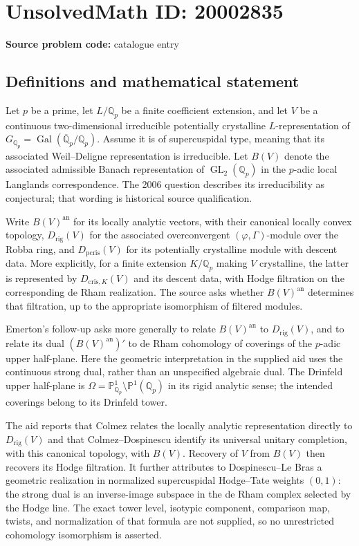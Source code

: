 \documentclass[11pt]{article}
\newcommand{\Q}{\mathbb{Q}}
\newcommand{\PP}{\mathbb{P}}
\begin{document}
\section*{UnsolvedMath ID: 20002835}
\textbf{Source problem code:} catalogue entry
\subsection{Definitions and mathematical statement}
Let $p$ be a prime, let $L/\Q_p$ be a finite coefficient extension, and let $V$ be a continuous two-dimensional irreducible potentially crystalline $L$-representation of $G_{\Q_p}=\operatorname{Gal}(\overline{\Q}_p/\Q_p)$. Assume it is of supercuspidal type, meaning that its associated Weil--Deligne representation is irreducible. Let $B(V)$ denote the associated admissible Banach representation of $\operatorname{GL}_2(\Q_p)$ in the $p$-adic local Langlands correspondence. The 2006 question describes its irreducibility as conjectural; that wording is historical source qualification.

Write $B(V)^{\mathrm{an}}$ for its locally analytic vectors, with their canonical locally convex topology, $D_{\mathrm{rig}}(V)$ for the associated overconvergent $(\varphi,\Gamma)$-module over the Robba ring, and $D_{\mathrm{pcris}}(V)$ for its potentially crystalline module with descent data. More explicitly, for a finite extension $K/\Q_p$ making $V$ crystalline, the latter is represented by $D_{\mathrm{cris},K}(V)$ and its descent data, with Hodge filtration on the corresponding de Rham realization. The source asks whether $B(V)^{\mathrm{an}}$ determines that filtration, up to the appropriate isomorphism of filtered modules.

Emerton's follow-up asks more generally to relate $B(V)^{\mathrm{an}}$ to $D_{\mathrm{rig}}(V)$, and to relate its dual $(B(V)^{\mathrm{an}})'$ to de Rham cohomology of coverings of the $p$-adic upper half-plane. Here the geometric interpretation in the supplied aid uses the continuous strong dual, rather than an unspecified algebraic dual. The Drinfeld upper half-plane is $\Omega=\PP^1_{\Q_p}\setminus\PP^1(\Q_p)$ in its rigid analytic sense; the intended coverings belong to its Drinfeld tower.

The aid reports that Colmez relates the locally analytic representation directly to $D_{\mathrm{rig}}(V)$ and that Colmez--Dospinescu identify its universal unitary completion, with this canonical topology, with $B(V)$. Recovery of $V$ from $B(V)$ then recovers its Hodge filtration. It further attributes to Dospinescu--Le Bras a geometric realization in normalized supercuspidal Hodge--Tate weights $(0,1)$: the strong dual is an inverse-image subspace in the de Rham complex selected by the Hodge line. The exact tower level, isotypic component, comparison map, twists, and normalization of that formula are not supplied, so no unrestricted cohomology isomorphism is asserted.
\end{document}
